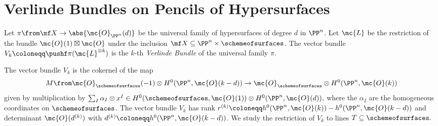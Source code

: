 \section{Verlinde Bundles on Pencils of Hypersurfaces}

\begin{definition}
Let $\pi\from \mf X \to \abs{\mc{O}_{\PP^n}(d)}$ be the universal family of hypersurfaces of degree $d$ in $\PP^n$. Let $\mc{L}$ be the restriction of the bundle $\mc{O}(1)\boxtimes \mc{O}$ under the inclusion $\mf X \subseteq \PP^n \times \schemeofsurfaces$. The vector bundle $V_k \coloneqq \pushf \pi (\mc{L}^{\otimes k})$ is the $k$-th \emph{Verlinde Bundle} of the universal family $\pi$.
\end{definition}
The vector bundle $V_k$ is the cokernel of the map
\[
M \from \mc{O}_{\schemeofsurfaces}(-1)
\otimes H^0(\PP^n,\mc{O}(k-d))
	\to \mc{O}_{\schemeofsurfaces} \otimes H^0(\PP^n,\mc{O}(k))
\]
given by multiplication by
$\sum_I \alpha_I \otimes x^I
\in H^0(\schemeofsurfaces,\mc{O}(1)) \otimes H^0(\PP^n,\mc{O}(d)),$ where the $\alpha_I$ are the homogeneous coordinates on $\schemeofsurfaces$. The vector bundle $V_k$ has rank $r^{(k)}\coloneqq h^0(\PP^n, \mc{O}(k))-h^0(\PP^n, \mc{O}(k-d))$ and determinant $\mc{O}(d^{(k)})$ with $d^{(k)}\coloneqq h^0(\PP^n,\mc{O}(k-d))$.
We study the restriction of $V_k$ to lines $T\subseteq \schemeofsurfaces.$





